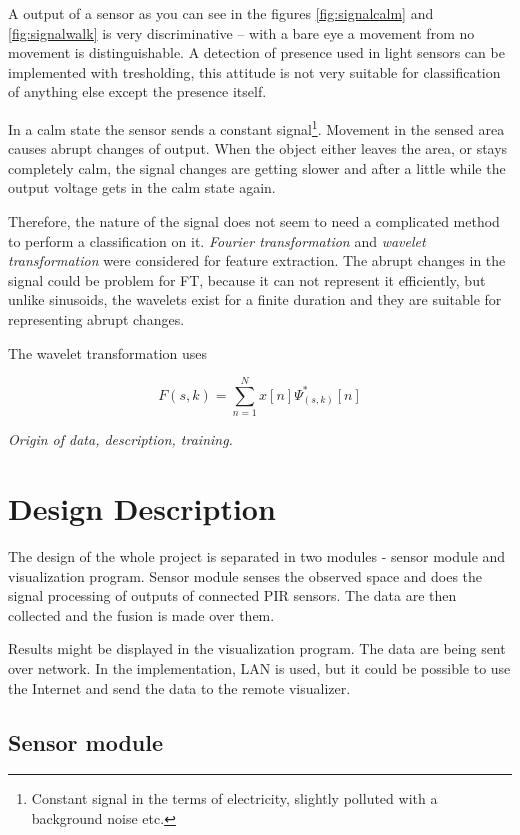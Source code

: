 A output of a sensor as you can see in the figures \ref{fig:signalcalm} and \ref{fig:signalwalk}
is very discriminative -- with a bare eye a movement from no movement is distinguishable.
A detection of presence used in light sensors can be implemented with tresholding, this attitude is
not very suitable for classification of anything else except the presence itself.

In a calm state the sensor sends a constant signal\footnote{Constant signal in the terms
of electricity, slightly polluted with a background noise etc.}. Movement in the sensed area causes
abrupt changes of output. When the object either leaves the area, or stays completely calm, the signal
changes are getting slower and after a little while the output voltage gets in the calm state again.

Therefore, the nature of the signal does not seem to need a complicated method to perform a classification on it.
{\it Fourier transformation} and {\it wavelet transformation} were considered for feature
extraction. The abrupt changes in the signal could be problem for FT, because it can not represent
it efficiently\cite{SinglePIR}, %
but unlike sinusoids, the wavelets exist for a finite duration and they are suitable for representing
abrupt changes.

The wavelet transformation uses 

$$F(s,k) = \sum_{n=1}^{N} x[n] \Psi_{(s,k)}^{*}[n]$$

{\it Origin of data, description, training.}




\chapter{Design Description}

The design of the whole project is separated in two modules - sensor module
and visualization program. Sensor module senses the observed space and does the
signal processing of outputs of connected PIR sensors. The data are then collected
and the fusion is made over them.

Results might be displayed in the visualization program. The data are being sent
over network. In the implementation, LAN is used, but it could be possible to
use the Internet and send the data to the remote visualizer.


\section{Sensor module}

